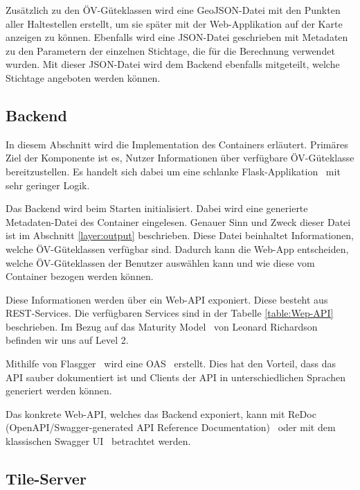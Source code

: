 Zusätzlich zu den \acs{ÖV}-Güteklassen wird eine GeoJSON-Datei mit den Punkten aller Haltestellen erstellt, um sie später mit der Web-Applikation auf der Karte anzeigen zu können.
Ebenfalls wird eine JSON-Datei geschrieben mit Metadaten zu den Parametern der einzelnen Stichtage, die für die Berechnung verwendet wurden.
Mit dieser JSON-Datei wird dem Backend ebenfalls mitgeteilt, welche Stichtage angeboten werden können.

\subsection{Backend}
\label{Implementation:Backend}

In diesem Abschnitt wird die Implementation des Containers  erläutert.
Primäres Ziel der Komponente ist es, Nutzer Informationen über verfügbare \acs{ÖV}-Güteklasse bereitzustellen.
Es handelt sich dabei um eine schlanke Flask-Applikation~\cite{flask} mit sehr geringer Logik.

Das Backend wird beim Starten initialisiert.
Dabei wird eine generierte Metadaten-Datei des Container  eingelesen.
Genauer Sinn und Zweck dieser Datei ist im Abschnitt \ref{layer:output} beschrieben.
Diese Datei beinhaltet Informationen, welche \acs{ÖV}-Güteklassen verfügbar sind.
Dadurch kann die Web-App entscheiden, welche \acs{ÖV}-Güteklassen der Benutzer auswählen kann und wie diese vom Container  bezogen werden können.

Diese Informationen werden über ein Web-\ac{API} exponiert.
Diese besteht aus \acl{REST}-Services.
Die verfügbaren Services sind in der Tabelle \ref{table:Wep-API} beschrieben.
Im Bezug auf das Maturity Model~\cite{maturity_model} von Leonard Richardson befinden wir uns auf Level 2.

Mithilfe von Flasgger~\cite{flasgger} wird eine \ac{OAS}~\cite{open-api-specificaiton} erstellt.
Dies hat den Vorteil, dass das \ac{API} sauber dokumentiert ist und Clients der \ac{API} in unterschiedlichen Sprachen generiert werden können.

Das konkrete Web-\ac{API}, welches das Backend exponiert, kann mit ReDoc (OpenAPI/Swagger-generated API Reference Documentation)~\cite{oevgk18-backend-api-spec} oder mit dem klassischen Swagger UI~\cite{oevgk18-backend-api-swaggerui} betrachtet werden.

\subsection{Tile-Server}
\label{Implementation:Tile-Server}

